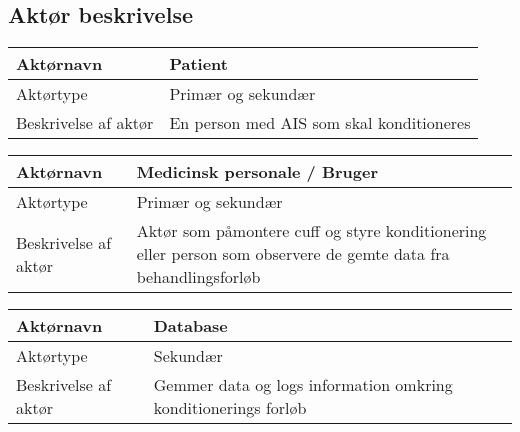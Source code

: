 	\subsection{Aktør beskrivelse}
	\begin{center}
		\begin{tabular}{ | m{4cm} | m{8cm}| } 
			\hline
			Aktørnavn& Patient \\ 
			\hline
			Aktørtype & Primær og sekundær \\ 
			\hline
			Beskrivelse af aktør & En person med AIS som skal konditioneres\\ 
			\hline
		\end{tabular}
	\end{center}
	
	\begin{center}
		\begin{tabular}{ | m{4cm} | m{8cm}| } 
			\hline
			Aktørnavn& Medicinsk personale / Bruger \\ 
			\hline
			Aktørtype & Primær og sekundær \\ 
			\hline
			Beskrivelse af aktør & Aktør som påmontere cuff og styre konditionering eller person som observere de gemte data fra behandlingsforløb\\ 
			\hline
		\end{tabular}
	\end{center}
	
	\begin{center}
		\begin{tabular}{ | m{4cm} | m{8cm}| } 
			\hline
			Aktørnavn& Database \\ 
			\hline
			Aktørtype & Sekundær \\ 
			\hline
			Beskrivelse af aktør & Gemmer data og logs information omkring konditionerings forløb\\ 
			\hline
		\end{tabular}
	\end{center}